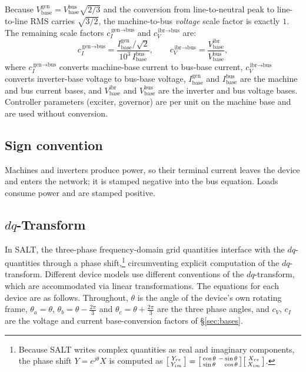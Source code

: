 \documentclass[11pt]{article}
\begin{document}
\medskip
Because $V_{\text{base}}^{\text{gen}} = V_{\text{base}}^{\text{bus}}\sqrt{2/3}$
and the conversion from line-to-neutral peak to line-to-line RMS carries
$\sqrt{3/2}$, the machine-to-bus \emph{voltage} scale factor is exactly $1$.
The remaining scale factors
$c_I^{\,\text{gen}\to\text{bus}}$ and $c_V^{\,\text{ibr}\to\text{bus}}$ are:
\begin{equation}
  c_I^{\,\text{gen}\to\text{bus}} = \frac{I_{\text{base}}^{\text{gen}}/\sqrt{2}}{10^3\,I_{\text{base}}^{\text{bus}}},
  \qquad
  c_V^{\,\text{ibr}\to\text{bus}} = \frac{V_{\text{base}}^{\text{ibr}}}{V_{\text{base}}^{\text{bus}}},
\end{equation}
where $c_I^{\,\text{gen}\to\text{bus}}$ converts machine-base current to
bus-base current, $c_V^{\,\text{ibr}\to\text{bus}}$ converts inverter-base
voltage to bus-base voltage, $I_{\text{base}}^{\text{gen}}$ and
$I_{\text{base}}^{\text{bus}}$ are the machine and bus current bases, and
$V_{\text{base}}^{\text{ibr}}$ and $V_{\text{base}}^{\text{bus}}$ are the
inverter and bus voltage bases. Controller parameters (exciter, governor)
are per unit on the machine base and are used without conversion.

\subsection{Sign convention}

Machines and inverters produce power, so their terminal current leaves the
device and enters the network; it is stamped negative into the bus equation.
Loads consume power and are stamped positive.

\subsection{\texorpdfstring{$dq$}{dq}-Transform}

In SALT, the three-phase frequency-domain grid quantities interface with
the $dq$-quantities through a phase shift,\footnote{Because SALT writes
complex quantities as real and imaginary components, the phase shift
$Y = e^{j\theta}X$ is computed as
$\begin{bsmallmatrix}Y_{re}\\ Y_{im}\end{bsmallmatrix}
 = \begin{bsmallmatrix}\cos\theta & -\sin\theta\\
                       \sin\theta & \phantom{-}\cos\theta\end{bsmallmatrix}
   \begin{bsmallmatrix}X_{re}\\ X_{im}\end{bsmallmatrix}$.}
circumventing explicit computation of the $dq$-transform. Different device
models use different conventions of the $dq$-transform, which are
accommodated via linear transformations. The equations for each device are
as follows. Throughout, $\theta$ is the angle of the device's own rotating
frame, $\theta_{a}=\theta$, $\theta_{b}=\theta-\tfrac{2\pi}{3}$ and
$\theta_{c}=\theta+\tfrac{2\pi}{3}$ are the three phase angles, and
$c_V$, $c_I$ are the voltage and current base-conversion factors of
\S\ref{sec:bases}.
\end{document}

